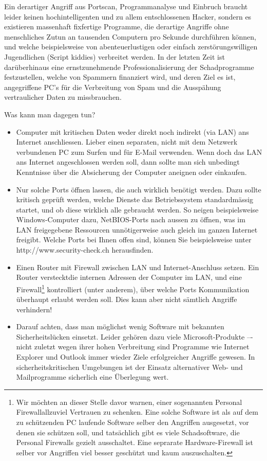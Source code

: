 Ein derartiger Angriff aus Portscan, Programmanalyse und Einbruch braucht leider keinen hochintelligenten und zu allem entschlossenen
Hacker, sondern es existieren massenhaft fixfertige Programme, die derartige Angriffe ohne menschliches Zutun an tausenden Computern
pro Sekunde durchführen können, und welche beispielsweise von abenteuerlustigen oder einfach zerstörungswilligen Jugendlichen (\glqq Script kiddies\grqq) verbreitet werden. In der letzten Zeit ist darüberhinaus eine ernstzunehmende Professionalisierung der Schadprogramme festzustellen, welche von Spammern finanziert wird, und deren Ziel es ist, angegriffene PC's für die Verbreitung von Spam und die Ausspähung vertraulicher Daten zu missbrauchen.

\medskip

Was kann man dagegen tun?
\begin{itemize}
  \item {Computer mit kritischen Daten weder direkt noch indirekt (via LAN) ans
  Internet anschliessen. Lieber einen separaten, nicht mit dem Netzwerk verbundenen PC zum Surfen und für E-Mail
  verwenden.
  Wenn doch das LAN ans Internet angeschlossen werden soll, dann sollte man sich unbedingt Kenntnisse über die Absicherung der
   Computer aneignen oder einkaufen.}
  \item  {Nur solche Ports öffnen lassen, die auch wirklich benötigt werden. Dazu sollte kritisch geprüft werden, welche
  Dienste das Betriebssystem standardmässig startet, und ob diese wirklich alle gebraucht werden. So neigen beispielsweise
  Windows-Computer dazu, NetBIOS-Ports nach aussen zu öffnen, was im LAN freigegebene Ressourcen unnötigerweise auch gleich
   im ganzen Internet freigibt. Welche Ports bei Ihnen offen sind, können Sie beispielsweise unter http://www.security-check.ch herausfinden.}
  \item{Einen Router mit Firewall zwischen LAN und Internet-Anschluss setzen.
  Ein Router \glqq versteckt\grqq{}die internen Adressen der Computer im LAN,
  und eine Firewall\footnote{Wir möchten an dieser Stelle davor warnen, einer
  sogenannten \glqq Personal Firewall\grqq{}allzuviel Vertrauen zu schenken.
  Eine solche Software ist als auf dem zu schützenden PC laufende Software
  selber den Angriffen ausgesetzt, vor denen sie schützen soll, und tatsächlich
  gibt es viele Schadsoftware, die Personal Firewalls gezielt ausschaltet. Eine
  seprarate Hardware-Firewall ist selber vor Angriffen viel besser geschützt und
  kaum auszuschalten.} kontrolliert (unter anderem),
  über welche Ports Kommunikation überhaupt erlaubt werden soll. Dies kann
  aber nicht sämtlich Angriffe verhindern!}
  \item {Darauf achten, dass man möglichst wenig Software mit bekannten Sicherheitslücken einsetzt. Leider gehören dazu viele
  Microsoft-Produkte –- nicht zuletzt wegen ihrer hohen Verbreitung sind Programme wie Internet Explorer und Outlook immer wieder
  Ziele erfolgreicher Angriffe gewesen.
  In sicherheitskritischen Umgebungen ist der Einsatz alternativer Web- und Mailprogramme sicherlich eine Überlegung wert.}
\end{itemize}

